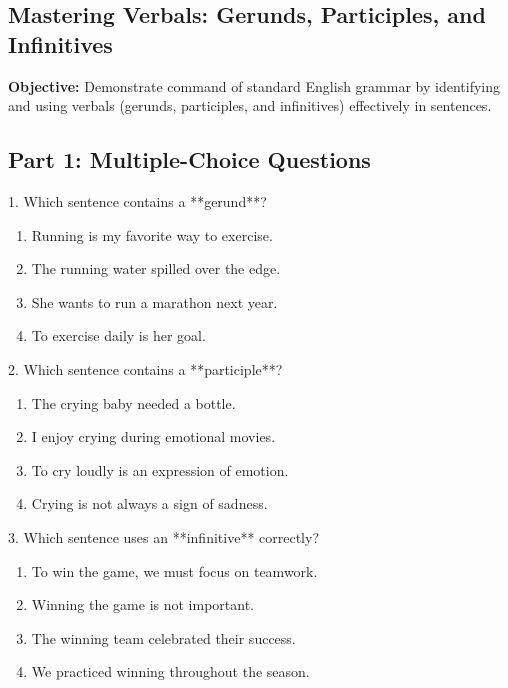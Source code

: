 \documentclass[12pt]{article}
\begin{document}
\subsection*{Mastering Verbals: Gerunds, Participles, and Infinitives}
\onehalfspacing

\begin{tcolorbox}[colframe=black!40, colback=gray!0, title=Learning Objective]
\textbf{Objective:} Demonstrate command of standard English grammar by identifying and using verbals (gerunds, participles, and infinitives) effectively in sentences.
\end{tcolorbox}

\subsection*{Part 1: Multiple-Choice Questions}

1. Which sentence contains a **gerund**?  
\begin{enumerate}[label=\Alph*.]
    \item Running is my favorite way to exercise.  
    \item The running water spilled over the edge.  
    \item She wants to run a marathon next year.  
    \item To exercise daily is her goal.  
\end{enumerate}

\vspace{1cm}

2. Which sentence contains a **participle**?  
\begin{enumerate}[label=\Alph*.]
    \item The crying baby needed a bottle.  
    \item I enjoy crying during emotional movies.  
    \item To cry loudly is an expression of emotion.  
    \item Crying is not always a sign of sadness.  
\end{enumerate}

\vspace{1cm}

3. Which sentence uses an **infinitive** correctly?  
\begin{enumerate}[label=\Alph*.]
    \item To win the game, we must focus on teamwork.  
    \item Winning the game is not important.  
    \item The winning team celebrated their success.  
    \item We practiced winning throughout the season.  
\end{enumerate}
\end{document}

